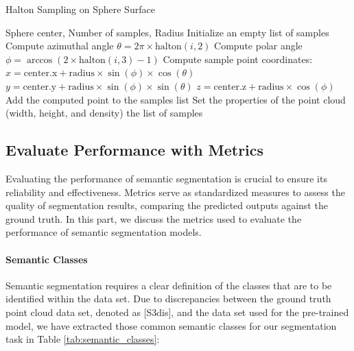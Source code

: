\documentclass[11pt, a4paper,oneside,chapterprefix=false]{scrbook}
\begin{document}
\begin{algorithm}[H]
\caption{Halton Sampling on Sphere Surface}
\begin{algorithmic}[1]
\Require Sphere center, Number of samples, Radius
\State Initialize an empty list of samples
    \State Compute azimuthal angle \( \theta = 2 \pi \times \text{halton}(i, 2) \)
    \State Compute polar angle \( \phi = \arccos(2 \times \text{halton}(i, 3) - 1) \)
    \State Compute sample point coordinates:
    \State \( x = \text{center.x} + \text{radius} \times \sin(\phi) \times \cos(\theta) \)
    \State \( y = \text{center.y} + \text{radius} \times \sin(\phi) \times \sin(\theta) \)
    \State \( z = \text{center.z} + \text{radius} \times \cos(\phi) \)
    \State Add the computed point to the samples list
\EndFor
\State Set the properties of the point cloud (width, height, and density)
\State \Return the list of samples
\end{algorithmic}
\end{algorithm}

\subsection{Evaluate Performance with Metrics}

Evaluating the performance of semantic segmentation is crucial to ensure its reliability and effectiveness. Metrics serve as standardized measures to assess the quality of segmentation results, comparing the predicted outputs against the ground truth. In this part, we discuss the metrics used to evaluate the performance of semantic segmentation models.

\paragraph{Semantic Classes}

Semantic segmentation requires a clear definition of the classes that are to be identified within the data set. Due to discrepancies between the ground truth point cloud data set, denoted as [S3dis], and the data set used for the pre-trained model, we have extracted those common semantic classes for our segmentation task in Table \ref{tab:semantic_classes}:
\end{document}
